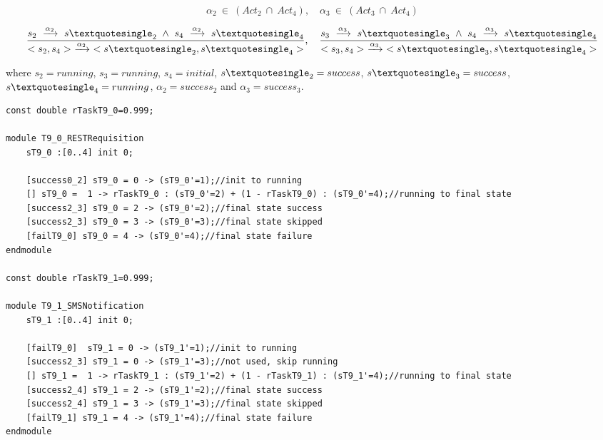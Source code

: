 $$\alpha_2\ \in\ (Act_2\ \cap\ Act_4),\quad \alpha_3\ \in\ (Act_3\ \cap\ Act_4)$$

$$\frac{s_2\ \xrightarrow{\alpha_2}\ s\textquotesingle_2\  \wedge\ s_4\ \xrightarrow{\alpha_2}\ s\textquotesingle_4}{<s_2, s_4>\ \xrightarrow{\alpha_2}\ <s\textquotesingle_2, s\textquotesingle_4>},\quad \frac{s_3\ \xrightarrow{\alpha_3}\ s\textquotesingle_3\  \wedge\ s_4\ \xrightarrow{\alpha_3}\ s\textquotesingle_4}{<s_3, s_4>\ \xrightarrow{\alpha_3}\ <s\textquotesingle_3, s\textquotesingle_4>}$$
\medskip

\noindent
where $s_2 = running$, $s_3 = running$, $s_4 = initial$, $s\textquotesingle_2 = success$, $s\textquotesingle_3 = success$, $s\textquotesingle_4 = running$, $\alpha_2 = success_2$ and $\alpha_3 = success_3$. 
\medskip

\begin{lstlisting}[language=Prism, caption={Conditional tasks T9.00 and T9.1 as DTMC modules.},label={lst:PRISM_TRY_TSKS}] 
const double rTaskT9_0=0.999;

module T9_0_RESTRequisition
	sT9_0 :[0..4] init 0;
	
	[success0_2] sT9_0 = 0 -> (sT9_0'=1);//init to running
	[] sT9_0 =  1 -> rTaskT9_0 : (sT9_0'=2) + (1 - rTaskT9_0) : (sT9_0'=4);//running to final state
	[success2_3] sT9_0 = 2 -> (sT9_0'=2);//final state success
	[success2_3] sT9_0 = 3 -> (sT9_0'=3);//final state skipped
	[failT9_0] sT9_0 = 4 -> (sT9_0'=4);//final state failure
endmodule

const double rTaskT9_1=0.999;

module T9_1_SMSNotification
	sT9_1 :[0..4] init 0;
	
	[failT9_0]  sT9_1 = 0 -> (sT9_1'=1);//init to running
	[success2_3] sT9_1 = 0 -> (sT9_1'=3);//not used, skip running
	[] sT9_1 =  1 -> rTaskT9_1 : (sT9_1'=2) + (1 - rTaskT9_1) : (sT9_1'=4);//running to final state
	[success2_4] sT9_1 = 2 -> (sT9_1'=2);//final state success
	[success2_4] sT9_1 = 3 -> (sT9_1'=3);//final state skipped
	[failT9_1] sT9_1 = 4 -> (sT9_1'=4);//final state failure
endmodule
\end{lstlisting}


